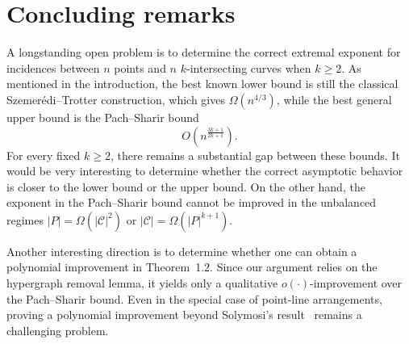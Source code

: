 \documentclass[11pt]{article}
\theoremstyle{plain}
\theoremstyle{definition}
\theoremstyle{remark}
\begin{document}
 


\section{Concluding remarks}

A longstanding open problem is to determine the correct extremal exponent for incidences between \(n\) points and \(n\) \(k\)-intersecting curves when \(k\ge 2\). As mentioned in the introduction, the best known lower bound is still the classical Szemer\'edi--Trotter construction, which gives \(\Omega(n^{4/3})\), while the best general upper bound is the Pach--Sharir bound
\[
O\!\left(n^{\frac{3k+1}{2k+1}}\right).
\]
For every fixed \(k\ge 2\), there remains a substantial gap between these bounds. It would be very interesting to determine whether the correct asymptotic behavior is closer to the lower bound or the upper bound. On the other hand, the exponent in the Pach--Sharir bound cannot be improved in the unbalanced regimes \( |P|=\Omega(|\mathcal{C}|^{2}) \) or \( |\mathcal C|=\Omega(|P|^{k+1}) \). 

Another interesting direction is to determine whether one can obtain a polynomial improvement in Theorem~1.2. Since our argument relies on the hypergraph removal lemma, it yields only a qualitative \(o(\cdot)\)-improvement over the Pach--Sharir bound. Even in the special case of point-line arrangements, proving a polynomial improvement beyond Solymosi's result~\cite{SolymosiLocallyDense} remains a challenging problem.
\end{document}
